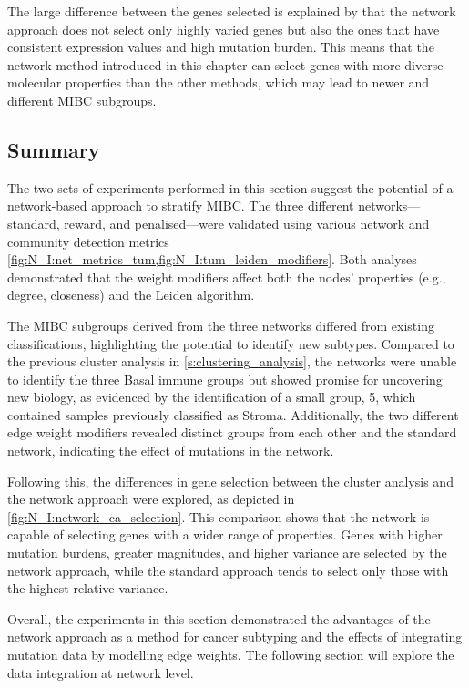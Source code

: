 The large difference between the genes selected is explained by that the network approach does not select only highly varied genes but also the ones that have consistent expression values and high mutation burden. This means that the network method introduced in this chapter can select genes with more diverse molecular properties than the other methods, which may lead to newer and different MIBC subgroups.


\subsection{Summary}

The two sets of experiments performed in this section suggest the potential of a network-based approach to stratify MIBC. The three different networks—standard, reward, and penalised—were validated using various network and community detection metrics \cref{fig:N_I:net_metrics_tum,fig:N_I:tum_leiden_modifiers}. Both analyses demonstrated that the weight modifiers affect both the nodes' properties (e.g., degree, closeness) and the Leiden algorithm.

The MIBC subgroups derived from the three networks differed from existing classifications, highlighting the potential to identify new subtypes. Compared to the previous cluster analysis in \cref{s:clustering_analysis}, the networks were unable to identify the three Basal immune groups but showed promise for uncovering new biology, as evidenced by the identification of a small group, 5, which contained samples previously classified as Stroma. Additionally, the two different edge weight modifiers revealed distinct groups from each other and the standard network, indicating the effect of mutations in the network.

Following this, the differences in gene selection between the cluster analysis and the network approach were explored, as depicted in \cref{fig:N_I:network_ca_selection}. This comparison shows that the network is capable of selecting genes with a wider range of properties. Genes with higher mutation burdens, greater magnitudes, and higher variance are selected by the network approach, while the standard approach tends to select only those with the highest relative variance.

Overall, the experiments in this section demonstrated the advantages of the network approach as a method for cancer subtyping and the effects of integrating mutation data by modelling edge weights. The following section will explore the data integration at network level.

